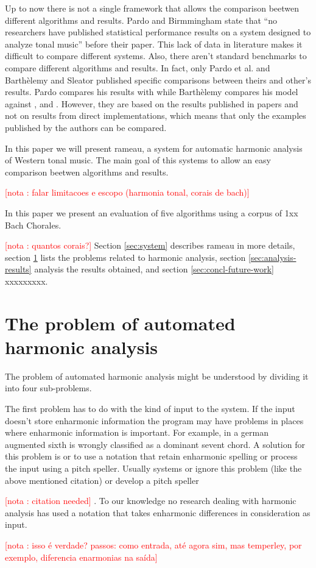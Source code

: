 \documentclass{article}
\newcounter{notacounter}
\newcommand{\nota}[1]{
  \addtocounter{notacounter}{1}
  \textcolor{red}{[nota \arabic{notacounter}: #1]}
}
\begin{document}

Up to now there is not a single framework that allows the comparison
beetwen different algorithms and results. Pardo and Birmmingham state
that ``no researchers have published statistical performance results
on a system designed to analyze tonal music''
\cite{pardo02:algorithms} before their paper. This lack of data in
literature makes it difficult to compare different systems. Also,
there aren't standard benchmarks to compare different algorithms and
results. In fact, only Pardo et al. \cite{pardo00:automated} and
Barthèlemy and Sleator \cite{barthelemy01:figured} published specific
comparisons between theirs and other's results. Pardo compares his
results with \cite{temperley99:modeling} while Barthèlemy compares his
model against \cite{maxwell92:expert}, \cite{pardo99:automated} and
\cite{temperley96:algorithm}. However, they are based on the results
published in papers and not on results from direct implementations,
which means that only the examples published by the authors can be
compared.

In this paper we will present rameau, a system for automatic harmonic
analysis of Western tonal music. The main goal of this systems to
allow an easy comparison beetwen algorithms and results. \nota{falar
  limitacoes e escopo (harmonia tonal, corais de bach)}

In this paper we present an evaluation of five algorithms using a
corpus of 1xx Bach Chorales. \nota{quantos corais?} Section
\ref{sec:system} describes rameau in more details, section
\ref{sec:problem} lists the problems related to harmonic analysis,
section \ref{sec:analysis-results} analysis the results obtained, and
section \ref{sec:concl-future-work} xxxxxxxxx.

\section{The problem of automated harmonic analysis}
\label{sec:problem}

The problem of automated harmonic analysis might be understood by
dividing it into four sub-problems. 

The first problem has to do with the kind of input to the system. If
the input doesn't store enharmonic information the program may have
problems in places where enharmonic information is important. For
example, in \cite{pardo02:algorithms} a german augmented sixth is
wrongly classified as a dominant sevent chord. A solution for this
problem is or to use a notation that retain enharmonic spelling or
process the input using a pitch speller. Usually systems or ignore
this problem (like the above mentioned citation) or develop a pitch
speller \nota{citation needed}. To our knowledge no research dealing
with harmonic analysis has used a notation that takes enharmonic
differences in consideration as input. \nota{isso é verdade? passos:
  como entrada, até agora sim, mas temperley, por exemplo, diferencia
  enarmonias na saída}
\end{document}
